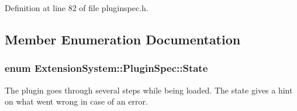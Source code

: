 \-Definition at line 82 of file pluginspec.\-h.



\subsection{\-Member \-Enumeration \-Documentation}
\hypertarget{class_extension_system_1_1_plugin_spec_a3d40e1bd1f17eb32b314bcd282b3e3b9}{
\subsubsection[{\-State}]{\setlength{\rightskip}{0pt plus 5cm}enum {\bf \-Extension\-System\-::\-Plugin\-Spec\-::\-State}}}\label{class_extension_system_1_1_plugin_spec_a3d40e1bd1f17eb32b314bcd282b3e3b9}
\-The plugin goes through several steps while being loaded. \-The state gives a hint on what went wrong in case of an error.

